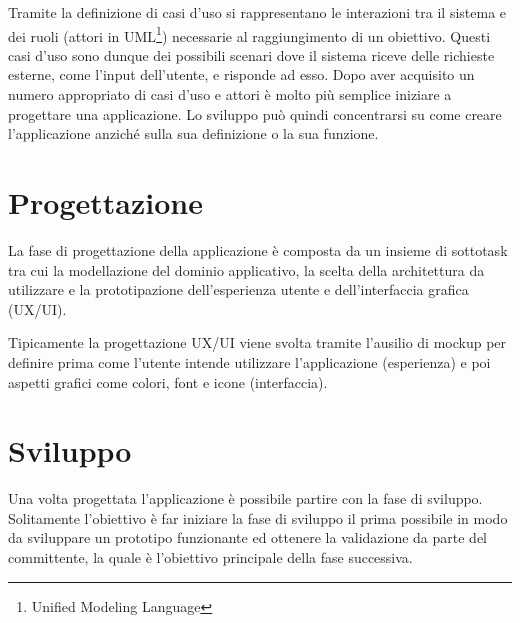 Tramite la definizione di casi d'uso si rappresentano le interazioni tra il sistema e dei ruoli (attori in UML\footnote{Unified Modeling Language}) necessarie al raggiungimento di un obiettivo. Questi casi d'uso sono dunque dei possibili scenari dove il sistema riceve delle richieste esterne, come l'input dell'utente, e risponde ad esso. Dopo aver acquisito un numero appropriato di casi d'uso e attori è molto più semplice iniziare a progettare una applicazione. Lo sviluppo può quindi concentrarsi su come creare l'applicazione anziché sulla sua definizione o la sua funzione.

\section{Progettazione}
La fase di progettazione della applicazione è composta da un insieme di sottotask tra cui la modellazione del dominio applicativo, la scelta della architettura da utilizzare e la prototipazione dell'esperienza utente e dell'interfaccia grafica (UX/UI).

Tipicamente la progettazione UX/UI viene svolta tramite l'ausilio di mockup per definire prima come l'utente intende utilizzare l'applicazione (esperienza) e poi aspetti grafici come colori, font e icone (interfaccia).

\section{Sviluppo}
Una volta progettata l'applicazione è possibile partire con la fase di sviluppo. Solitamente l'obiettivo è far iniziare la fase di sviluppo il prima possibile in modo da sviluppare un prototipo funzionante ed ottenere la validazione da parte del committente, la quale è l'obiettivo principale della fase successiva.

